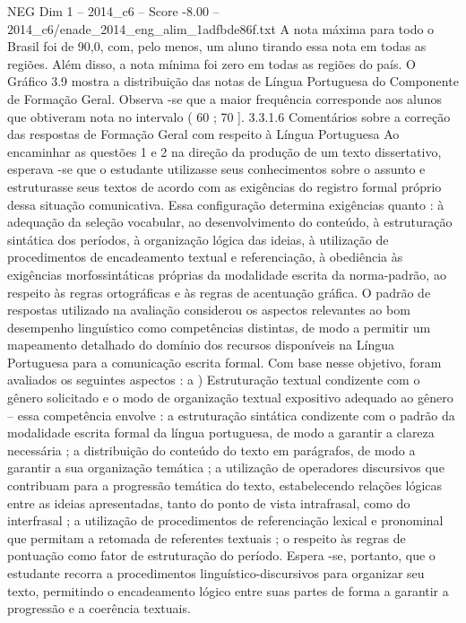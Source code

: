 \begin{textsample}{NEG Dim 1 – 2014\_c6 – Score -8.00 – 2014\_c6/enade\_2014\_eng\_alim\_1adfbde86f.txt}
A nota máxima para todo o Brasil foi de 90,0, com, pelo menos, um aluno tirando essa nota em todas as regiões.
Além disso, a nota mínima foi zero em todas as regiões do país.
O Gráfico 3.9 mostra a distribuição das notas de Língua Portuguesa do Componente de Formação Geral.
Observa -se que a maior frequência corresponde aos alunos que obtiveram nota no intervalo ( 60 ; 70 ]. 3.3.1.6 Comentários sobre a correção das respostas de Formação Geral com respeito à Língua Portuguesa Ao encaminhar as questões 1 e 2 na direção da produção de um texto dissertativo, esperava -se que o estudante utilizasse seus conhecimentos sobre o assunto e estruturasse seus textos de acordo com as exigências do registro formal próprio dessa situação comunicativa.
Essa configuração determina exigências quanto : à adequação da seleção vocabular, ao desenvolvimento do conteúdo, à estruturação sintática dos períodos, à organização lógica das ideias, à utilização de procedimentos de encadeamento textual e referenciação, à obediência às exigências morfossintáticas próprias da modalidade escrita da norma-padrão, ao respeito às regras ortográficas e às regras de acentuação gráfica.
O padrão de respostas utilizado na avaliação considerou os aspectos relevantes ao bom desempenho linguístico como competências distintas, de modo a permitir um mapeamento detalhado do domínio dos recursos disponíveis na Língua Portuguesa para a comunicação escrita formal.
Com base nesse objetivo, foram avaliados os seguintes aspectos : a ) Estruturação textual condizente com o gênero solicitado e o modo de organização textual expositivo adequado ao gênero – essa competência envolve : a estruturação sintática condizente com o padrão da modalidade escrita formal da língua portuguesa, de modo a garantir a clareza necessária ; a distribuição do conteúdo do texto em parágrafos, de modo a garantir a sua organização temática ; a utilização de operadores discursivos que contribuam para a progressão temática do texto, estabelecendo relações lógicas entre as ideias apresentadas, tanto do ponto de vista intrafrasal, como do interfrasal ; a utilização de procedimentos de referenciação lexical e pronominal que permitam a retomada de referentes textuais ; o respeito às regras de pontuação como fator de estruturação do período.
Espera -se, portanto, que o estudante recorra a procedimentos linguístico-discursivos para organizar seu texto, permitindo o encadeamento lógico entre suas partes de forma a garantir a progressão e a coerência textuais.

\end{textsample}
